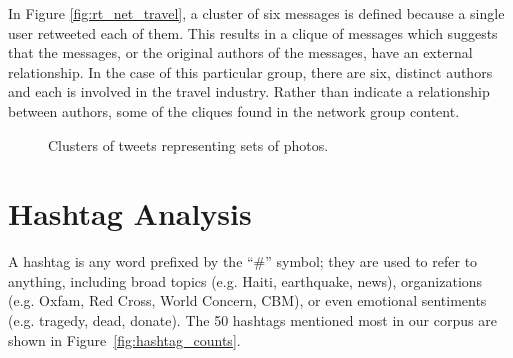 \documentclass[a4paper, 11pt, titlepage]{article}
\begin{document}
In Figure \ref{fig:rt_net_travel}, a cluster of six messages is defined because a single user retweeted each of them.  This results in a clique of messages which suggests that the messages, or the original authors of the messages, have an external relationship.  In the case of this particular group, there are six, distinct authors and each is involved in the travel industry.  Rather than indicate a relationship between authors, some of the cliques found in the network group content.

\begin{figure}[h]
\centering
{}
\quad
{}
\caption{Clusters of tweets representing sets of photos.}
\label{fig:rt_net_photos}
\end{figure}

\section{Hashtag Analysis}

A hashtag is any word prefixed by the ``\#'' symbol; they are used to refer to anything, including broad topics (e.g. Haiti, earthquake, news), organizations (e.g. Oxfam, Red Cross, World Concern, CBM), or even emotional sentiments (e.g. tragedy, dead, donate). The 50 hashtags mentioned most in our corpus are shown in Figure~\ref{fig:hashtag_counts}.
\end{document}
